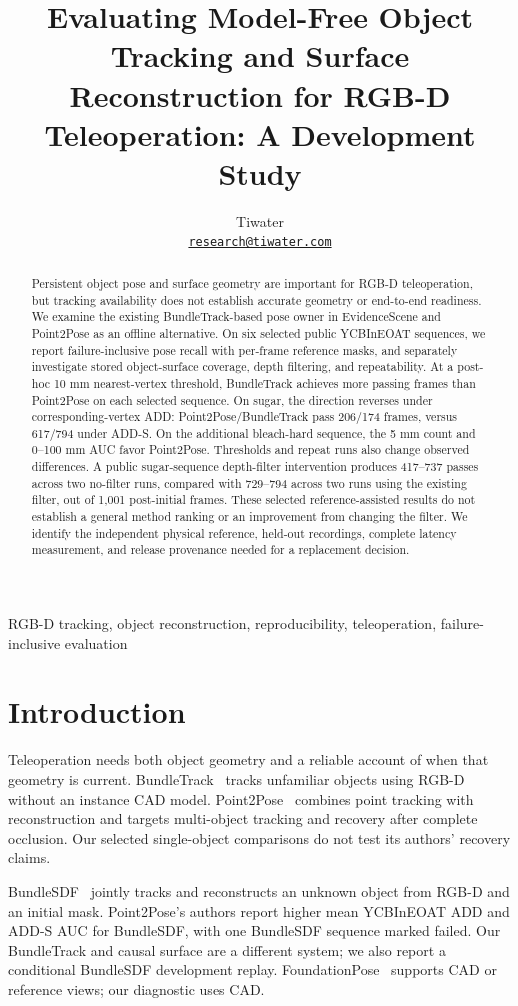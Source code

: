 \documentclass[10pt,journal]{IEEEtran}
\title{Evaluating Model-Free Object Tracking and Surface Reconstruction for RGB-D Teleoperation: A Development Study}
\author{Tiwater\\
{\normalsize\href{mailto:research@tiwater.com}{\texttt{research@tiwater.com}}}}
\begin{document}
\maketitle
\begin{abstract}\normalfont
Persistent object pose and surface geometry are important for RGB-D teleoperation, but tracking availability does not establish accurate geometry or end-to-end readiness. We examine the existing BundleTrack-based pose owner in EvidenceScene and Point2Pose as an offline alternative. On six selected public YCBInEOAT sequences, we report failure-inclusive pose recall with per-frame reference masks, and separately investigate stored object-surface coverage, depth filtering, and repeatability. At a post-hoc 10 mm nearest-vertex threshold, BundleTrack achieves more passing frames than Point2Pose on each selected sequence. On sugar, the direction reverses under corresponding-vertex ADD: Point2Pose/BundleTrack pass 206/174 frames, versus 617/794 under ADD-S. On the additional bleach-hard sequence, the 5 mm count and 0--100 mm AUC favor Point2Pose. Thresholds and repeat runs also change observed differences. A public sugar-sequence depth-filter intervention produces 417--737 passes across two no-filter runs, compared with 729--794 across two runs using the existing filter, out of 1,001 post-initial frames. These selected reference-assisted results do not establish a general method ranking or an improvement from changing the filter. We identify the independent physical reference, held-out recordings, complete latency measurement, and release provenance needed for a replacement decision.
\end{abstract}
\begin{IEEEkeywords}\normalfont RGB-D tracking, object reconstruction, reproducibility, teleoperation, failure-inclusive evaluation\end{IEEEkeywords}
\section{Introduction}
Teleoperation needs both object geometry and a reliable account of when that geometry is current. BundleTrack~\cite{bundletrack} tracks unfamiliar objects using RGB-D without an instance CAD model. Point2Pose~\cite{point2pose} combines point tracking with reconstruction and targets multi-object tracking and recovery after complete occlusion. Our selected single-object comparisons do not test its authors' recovery claims.

BundleSDF~\cite{bundlesdf} jointly tracks and reconstructs an unknown object from RGB-D and an initial mask. Point2Pose's authors report higher mean YCBInEOAT ADD and ADD-S AUC for BundleSDF, with one BundleSDF sequence marked failed. Our BundleTrack and causal surface are a different system; we also report a conditional BundleSDF development replay. FoundationPose~\cite{foundationpose} supports CAD or reference views; our diagnostic uses CAD.
\end{document}
